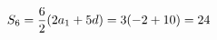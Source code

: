 \documentclass[preview]{standalone}
\begin{document}
\begin{align*}
\special{dvisvgm:raw <g id='unique000'>}S_6=\frac{6}{2}(2a_1+5d)=3(-2+10)=24\special{dvisvgm:raw </g>}
\end{align*}
\end{document}
